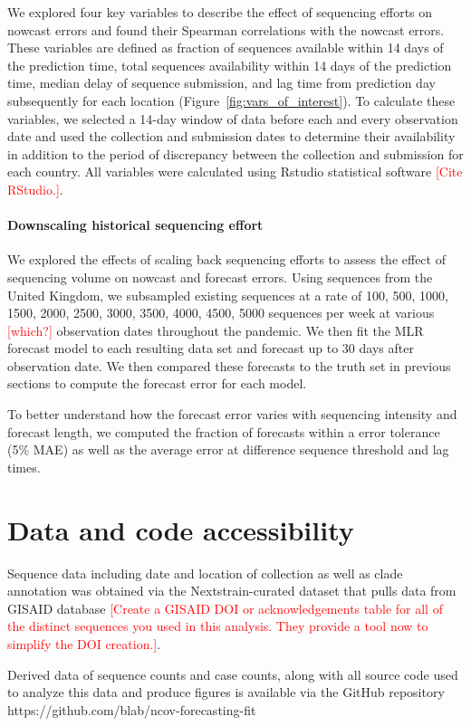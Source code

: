 \documentclass[11pt,oneside,letterpaper]{article}
\def\jhc#1{\textcolor{red}{[#1]}}
\begin{document}
We explored four key variables to describe the effect of sequencing efforts on nowcast errors and found their Spearman correlations with the nowcast errors.
These variables are defined as fraction of sequences available within 14 days of the prediction time, total sequences availability within 14 days of the prediction time, median delay of sequence submission, and lag time from prediction day subsequently for each location (Figure~\ref{fig:vars_of_interest}).
To calculate these variables, we selected a 14-day window of data before each and every observation date and used the collection and submission dates to determine their availability in addition to the period of discrepancy between the collection and submission for each country.
All variables were calculated using Rstudio statistical software \jhc{Cite RStudio.}.



\paragraph{Downscaling historical sequencing effort}

We explored the effects of scaling back sequencing efforts to assess the effect of sequencing volume on nowcast and forecast errors.
Using sequences from the United Kingdom, we subsampled existing sequences at a rate of 100, 500, 1000, 1500, 2000, 2500, 3000, 3500, 4000, 4500, 5000 sequences per week at various \jhc{which?} observation dates throughout the pandemic.
We then fit the MLR forecast model to each resulting data set and forecast up to 30 days after observation date.
We then compared these forecasts to the truth set in previous sections to compute the forecast error for each model.

To better understand how the forecast error varies with sequencing intensity and forecast length, we computed the fraction of forecasts within a error tolerance (5\% MAE) as well as the average error at difference sequence threshold and lag times.


\section*{Data and code accessibility}

Sequence data including date and location of collection as well as clade annotation was obtained via the Nextstrain-curated
dataset that pulls data from GISAID database \jhc{Create a GISAID DOI or acknowledgements table for all of the distinct sequences you used in this analysis. They provide a tool now to simplify the DOI creation.}.


Derived data of sequence counts and case counts, along with all source code used to analyze
this data and produce figures is available via the GitHub repository https://github.com/blab/ncov-forecasting-fit




\end{document}

